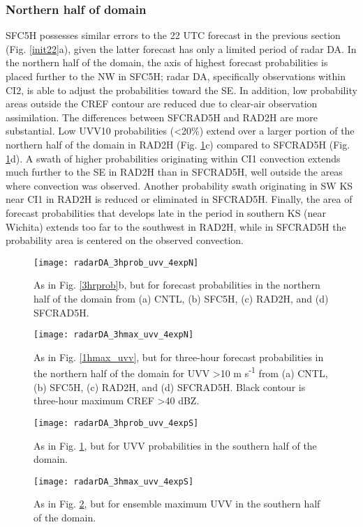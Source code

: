 \subsubsection{Northern half of domain}
SFC5H possesses similar errors to the 22 UTC forecast in the previous section (Fig. \ref{init22}a), given the latter forecast has only a limited period of radar DA. In the northern half of the domain, the axis of highest forecast probabilities is placed further to the NW in SFC5H; radar DA, specifically observations within CI2, is able to adjust the probabilities toward the SE. In addition, low probability areas outside the CREF contour are reduced due to clear-air observation assimilation. The differences between SFCRAD5H and RAD2H are more substantial. Low UVV10 probabilities (\textless 20\%) extend over a larger portion of the northern half of the domain in RAD2H (Fig. \ref{3hprobuvv4expN}c) compared to SFCRAD5H (Fig. \ref{3hprobuvv4expN}d). A swath of higher probabilities originating within CI1 convection extends much further to the SE in RAD2H than in SFCRAD5H, well outside the areas where convection was observed. Another probability swath originating in SW KS near CI1 in RAD2H is reduced or eliminated in SFCRAD5H. Finally, the area of forecast probabilities that develops late in the period in southern KS (near Wichita) extends too far to the southwest in RAD2H, while in SFCRAD5H the probability area is centered on the observed convection.

\begin{figure}
\centering
\texttt{[image: radarDA\_3hprob\_uvv\_4expN]}
\caption{As in Fig. \ref{3hrprob}b, but for forecast probabilities in the northern half of the domain from (a) CNTL, (b) SFC5H, (c) RAD2H, and (d) SFCRAD5H.}
\label{3hprobuvv4expN}
\end{figure}
\begin{figure}
\centering
\texttt{[image: radarDA\_3hmax\_uvv\_4expN]}
\caption{As in Fig. \ref{1hmax_uvv}, but for three-hour forecast probabilities in the northern half of the domain for UVV \textgreater 10 m s\textsuperscript{-1} from (a) CNTL, (b) SFC5H, (c) RAD2H, and (d) SFCRAD5H. Black contour is three-hour maximum CREF \textgreater 40 dBZ.}
\label{3hmaxuvv4expN}
\end{figure}
\begin{figure}
\centering
\texttt{[image: radarDA\_3hprob\_uvv\_4expS]}
\caption{As in Fig. \ref{3hprobuvv4expN}, but for UVV probabilities in the southern half of the domain.}
\label{3hprobuvv4expS}
\end{figure}
\begin{figure}
\centering
\texttt{[image: radarDA\_3hmax\_uvv\_4expS]}
\caption{As in Fig. \ref{3hmaxuvv4expN}, but for ensemble maximum UVV in the southern half of the domain.}
\label{3hmaxuvv4expS}
\end{figure}

